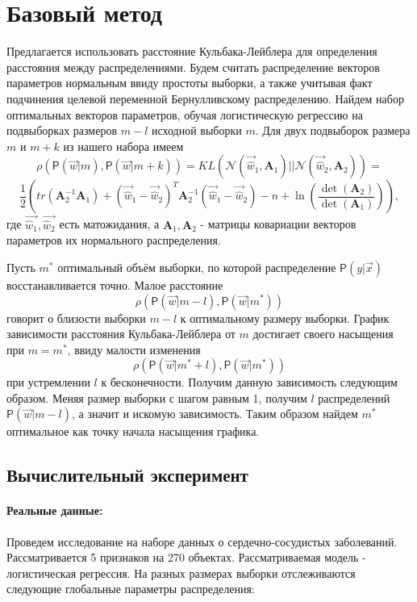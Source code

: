 \documentclass[12pt,twoside]{article}
\begin{document}
\subsection{}
\section{Базовый метод}
Предлагается использовать расстояние Кульбака-Лейблера для определения расстояния между распределениями.
Будем считать распределение векторов параметров нормальным ввиду простоты выборки, а также учитывая факт подчинения целевой переменной Бернулливскому распределению. Найдем набор оптимальных векторов параметров, обучая логистическую регрессию на подвыборках размеров $m-l$ исходной выборки $m$. Для двух подвыборок размера $m$ и $m+k$ из нашего набора имеем
$$\rho (\mathsf{P}(\vec{w}|m), \mathsf{P}(\vec{w}|m+k)) = KL(\mathcal{N}(\vec{\hat w}_1, \boldsymbol{A}_1)||\mathcal{N}(\vec{\hat w}_2, \boldsymbol{A}_2)) =$$
 $$\frac{1}{2}\left( tr(\boldsymbol{A}_2^{-1} \boldsymbol{A}_1) + (\vec{\hat w}_1 - \vec{\hat w}_2)^T \boldsymbol{A}_2^{-1}(\vec{\hat w}_1 - \vec{\hat w}_2) - n + \ln\left(\frac{\det(\boldsymbol{A}_2)}{\det(\boldsymbol{A}_1)}\right) \right),$$
 где $\vec{\hat w_1},\vec{\hat w_2}$ есть матожидания, а $\boldsymbol{A}_1, \boldsymbol{A}_2$ - матрицы ковариации
 векторов параметров их нормального распределения.

Пусть $m^*$ оптимальный объём выборки, по которой распределение $\mathsf{P}(y|\vec{x})$ восстанавливается точно. Малое расстояние $$\rho (\mathsf{P}(\vec{w}|m-l), \mathsf{P}(\vec{w}|m^*))$$ говорит о близости выборки $m-l$ к оптимальному размеру выборки. График зависимости расстояния Кульбака-Лейблера от $m$ достигает своего насыщения при $m = m^*$, ввиду малости изменения $$\rho (\mathsf{P}(\vec{w}|m^* + l), \mathsf{P}(\vec{w}|m^*))$$ при устремлении $l$ к бесконечности. Получим данную зависимость следующим образом. Меняя размер выборки с шагом равным 1, получим $l$ распределений $\mathsf{P}(\vec{w}|m-l)$, а значит и искомую зависимость. Таким образом найдем $m^*$ оптимальное как точку начала насыщения графика.

\subsection{}
\subsection{Вычислительный эксперимент}
\paragraph{Реальные данные:}
Проведем исследование на наборе данных о сердечно-сосудистых заболеваний. Рассматривается 5 признаков на 270 объектах. Рассматриваемая модель - логистическая регрессия. На разных размерах выборки отслеживаются следующие глобальные параметры распределения:
\end{document}
